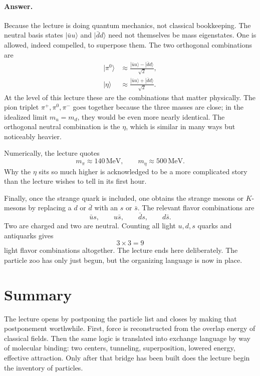 \paragraph{Answer.} Because the lecture is doing quantum mechanics, not classical bookkeeping. The neutral basis states \(|\bar u u\rangle\) and \(|\bar d d\rangle\) need not themselves be mass eigenstates. One is allowed, indeed compelled, to superpose them. The two orthogonal combinations are
\begin{align}
|\pi^0\rangle &\approx \frac{|\bar u u\rangle-|\bar d d\rangle}{\sqrt2},\\
|\eta\rangle &\approx \frac{|\bar u u\rangle+|\bar d d\rangle}{\sqrt2}.
\end{align}
At the level of this lecture these are the combinations that matter physically. The pion triplet \(\pi^+,\pi^0,\pi^-\) goes together because the three masses are close; in the idealized limit \(m_u=m_d\), they would be even more nearly identical. The orthogonal neutral combination is the \(\eta\), which is similar in many ways but noticeably heavier.

Numerically, the lecture quotes
\begin{equation}
m_\pi \approx 140\,\mathrm{MeV},
\qquad
m_\eta \approx 500\,\mathrm{MeV}.
\end{equation}
Why the \(\eta\) sits so much higher is acknowledged to be a more complicated story than the lecture wishes to tell in its first hour.

Finally, once the strange quark is included, one obtains the strange mesons or \(K\)-mesons by replacing a \(d\) or \(\bar d\) with an \(s\) or \(\bar s\). The relevant flavor combinations are
\begin{equation}
\bar u s,\qquad u\bar s,\qquad \bar d s,\qquad d\bar s.
\end{equation}
Two are charged and two are neutral. Counting all light \(u,d,s\) quarks and antiquarks gives
\begin{equation}
3\times 3 = 9
\end{equation}
light flavor combinations altogether. The lecture ends here deliberately. The particle zoo has only just begun, but the organizing language is now in place.

\section{Summary}

The lecture opens by postponing the particle list and closes by making that postponement worthwhile. First, force is reconstructed from the overlap energy of classical fields. Then the same logic is translated into exchange language by way of molecular binding: two centers, tunneling, superposition, lowered energy, effective attraction. Only after that bridge has been built does the lecture begin the inventory of particles.

